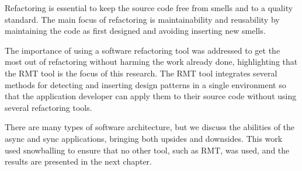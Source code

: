 Refactoring is essential to keep the source code free from smells and to a quality standard. The main focus of refactoring is maintainability and reusability by maintaining the code as first designed and avoiding inserting new smells.

The importance of using a software refactoring tool was addressed to get the most out of refactoring without harming the work already done, highlighting that the RMT tool is the focus of this research.
The RMT tool integrates several methods for detecting and inserting design patterns in a single environment so that the application developer can apply them to their source code without using several refactoring tools.

There are many types of software architecture, but we discuss the abilities of the async and sync applications, bringing both upsides and downsides. This work used snowballing to ensure that no other tool, such as RMT, was used, and the results are presented in the next chapter.